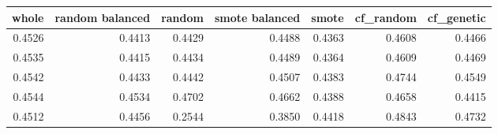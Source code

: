 \begin{tabular}{rrrrrrr}
\toprule

 whole &  random balanced &  random &  smote balanced &  smote &  cf\_random &  cf\_genetic \\
\midrule

0.4526 &           0.4413 &  0.4429 &          0.4488 & 0.4363 &     0.4608 &      0.4466 \\
0.4535 &           0.4415 &  0.4434 &          0.4489 & 0.4364 &     0.4609 &      0.4469 \\
0.4542 &           0.4433 &  0.4442 &          0.4507 & 0.4383 &     0.4744 &      0.4549 \\
0.4544 &           0.4534 &  0.4702 &          0.4662 & 0.4388 &     0.4658 &      0.4415 \\
0.4512 &           0.4456 &  0.2544 &          0.3850 & 0.4418 &     0.4843 &      0.4732 \\

\bottomrule
\end{tabular}
